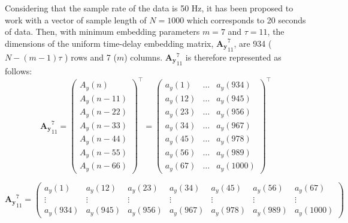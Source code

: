 Considering that the sample rate of the data is 50 Hz, it
has been proposed to work with a vector of sample length of $N=1000$ 
which corresponds to 20 seconds of data. 
Then, with minimum embedding parameters $m=7$ and $\tau=11$, 
the dimensions of the uniform time-delay embedding matrix, 
$\boldsymbol{{A_y}}^{7}_{11}$, are 934 ( $N-(m-1)\tau$ ) rows and 
7 ($m$) columns. 
$\boldsymbol{{A_y}}^{7}_{11}$ is therefore represented as follows:
\begin{equation} \label{eq:etde1_exampleA2}
\boldsymbol{{A_y}}^{7}_{11}  =
\begin{pmatrix}
  	{ A_y }(n) \\
  	{ A_y }(n-11) \\
	{ A_y }(n-22) \\
	{ A_y }(n-33) \\
	{ A_y }(n-44) \\
	{ A_y }(n-55) \\
  	{ A_y }(n-66) 
\end{pmatrix}^\intercal
=
\begin{pmatrix}
  	a_y(1)  & \dots & a_y(934) \\
  	a_y(12) & \dots & a_y(945) \\
  	a_y(23) & \dots & a_y(956) \\
  	a_y(34) & \dots & a_y(967) \\
  	a_y(45) & \dots & a_y(978) \\
  	a_y(56) & \dots & a_y(989) \\
  	a_y(67) & \dots & a_y(1000) 
\end{pmatrix}^\intercal   
\end{equation}


\begin{equation} \label{eq:etde2_exampleA2}
\boldsymbol{{A_y}}^{7}_{11}  = 
\begin{pmatrix}
  	a_y(1) & a_y(12) & a_y(23) & a_y(34) & a_y(45) & a_y(56) &  a_y(67) \\ 
	\vdots & \vdots & \vdots & \vdots & \vdots & \vdots & \vdots \\
  	a_y(934) & a_y(945) & a_y(956) &  a_y(967) &  a_y(978) &  a_y(989) & a_y(1000) 
\end{pmatrix}
\end{equation}

